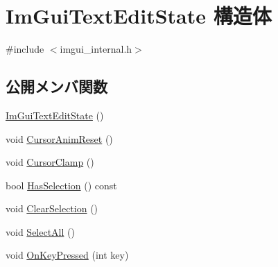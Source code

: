 \hypertarget{struct_im_gui_text_edit_state}{}\section{Im\+Gui\+Text\+Edit\+State 構造体}
\label{struct_im_gui_text_edit_state}


{\ttfamily \#include $<$imgui\+\_\+internal.\+h$>$}

\subsection*{公開メンバ関数}
\begin{DoxyCompactItemize}
\item 
\mbox{\hyperlink{struct_im_gui_text_edit_state_a475df87b81e95f80fa7bda77ca47d9fc}{Im\+Gui\+Text\+Edit\+State}} ()
\item 
void \mbox{\hyperlink{struct_im_gui_text_edit_state_abed49497339d5242f42d86193a2c683e}{Cursor\+Anim\+Reset}} ()
\item 
void \mbox{\hyperlink{struct_im_gui_text_edit_state_ac6f8184c63c826dfc9bc2a47ba57b80c}{Cursor\+Clamp}} ()
\item 
bool \mbox{\hyperlink{struct_im_gui_text_edit_state_a46735493114451380c2d3684b528d124}{Has\+Selection}} () const
\item 
void \mbox{\hyperlink{struct_im_gui_text_edit_state_ae753eb90c3bb7954dfc1e7fd0fef4460}{Clear\+Selection}} ()
\item 
void \mbox{\hyperlink{struct_im_gui_text_edit_state_ab6f494f3335bf7911b83cfc15edd612e}{Select\+All}} ()
\item 
void \mbox{\hyperlink{struct_im_gui_text_edit_state_a30a1d78690ef2bbb9d4b8f75385b8c26}{On\+Key\+Pressed}} (int key)
\end{DoxyCompactItemize}
